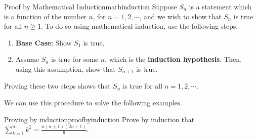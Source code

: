 \begin{procedure}{Proof by Mathematical Induction}{mathinduction}
Suppose $S_{n}$ is a statement which is a function of the number $n$, for $n=1,2,\cdots$, and
we wish to show that $S_{n}$ is true for all $n \geq 1$. To do so using mathematical induction, use the 
following steps.
\begin{enumerate}
\item \textbf{Base Case:} Show $S_{1}$ is true.

\item Assume $S_{n}$ is true for some $n$, which is the \textbf{induction hypothesis}. Then, using this assumption, 
show that $S_{n+1}$ is true. 
\end{enumerate}

Proving these two steps shows that $S_{n}$ is true for all $n = 1,2,\cdots$.
\end{procedure}

We can use this procedure to solve the following examples.

\begin{example}{Proving by induction}{proofbyinduction}
Prove by induction that $\sum_{k=1}^{n}k^{2}=\displaystyle
\frac{n\left( n+1\right) \left( 2n+1\right) }{6}$.
\end{example}

